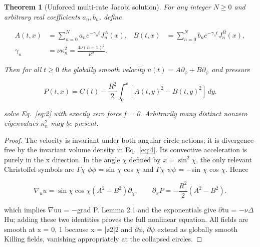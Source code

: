 \documentclass[10pt,letterpaper]{article}
\newtheorem{theorem}{Theorem}[section]
\theoremstyle{remark}
\begin{document}
\begin{theorem}[Unforced multi-rate Jacobi solution]

For any integer $N\ge0$ and arbitrary real coefficients $a_n,b_n$, define


\begin{equation}
\tag{10}\label{eq:10}
\begin{aligned} A(t,x)&=\sum_{n=0}^N a_ne^{-\gamma_nt}J_n^A(x),&B(t,x)&=\sum_{n=0}^N b_ne^{-\gamma_nt}J_n^B(x),\\ \gamma_n&=\nu\kappa_n^2=\frac{4\nu(n+1)^2}{R^2}.\end{aligned}
\end{equation}



Then for all $t\ge0$ the globally smooth velocity $u(t)=A\partial_\phi+B\partial_\psi$ and pressure



\begin{equation}
\tag{11}\label{eq:11}
P(t,x)=C(t)-\frac{R^2}2\int_0^x[A(t,y)^2-B(t,y)^2]\,dy.
\end{equation}

solve Eq.~\eqref{eq:2} with exactly zero force f = 0. Arbitrarily many distinct nonzero eigenvalues $\kappa_n^2$ may be present.


\end{theorem}

\begin{proof}
The velocity is invariant under both angular circle actions; it is divergence-free by the invariant volume density in Eq.~\eqref{eq:4}. Its convective acceleration is purely in the x direction. In the angle \(\chi \) defined by $x=\sin^2\chi$, the only relevant Christoffel symbols are \(\Gamma \chi \) \(\phi \phi \) = sin \(\chi \) cos \(\chi \) and \(\Gamma \chi \) \(\psi \psi \) = \(- \)sin \(\chi \) cos \(\chi \). Hence


\begin{equation}
\tag{12}\label{eq:12}
\nabla_uu=\sin\chi\cos\chi(A^2-B^2)\partial_\chi,\qquad\partial_xP=-\frac{R^2}2(A^2-B^2).
\end{equation}

which implies \(\nabla \)uu = \(- \)grad P. Lemma 2.1 and the exponentials give \(\partial \)tu = \(- \nu \Delta \)Hu; adding these two identities proves the full nonlinear equation. All fields are smooth at x = 0, 1 because x = |z2|2 and \(\partial \phi \), \(\partial \psi \) extend as globally smooth Killing fields, vanishing appropriately at the collapsed circles.


\end{proof}
\end{document}
